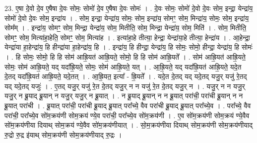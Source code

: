 \documentclass[17pt]{extarticle}
\begin{document}
23. ए॒षा दे॒वो दे॒व ए॒षैषा दे॒वः सोमः॒ सोमो॑ दे॒व ए॒षैषा दे॒वः सोमः॑ । . दे॒वः सोमः॒ सोमो॑ दे॒वो दे॒वः सोम॒ इन्द्रा॒ येन्द्रा॑य॒ सोमो॑ दे॒वो दे॒वः सोम॒ इन्द्रा॑य । . सोम॒ इन्द्रा॒ येन्द्रा॑य॒ सोमः॒ सोम॒ इन्द्रा॑य॒ सोमꣳ॒॒ सोम॒ मिन्द्रा॑य॒ सोमः॒ सोम॒ इन्द्रा॑य॒ सोम᳚म् । . इन्द्रा॑य॒ सोमꣳ॒॒ सोम॒ मिन्द्रा॒ येन्द्रा॑य॒ सोम॒ मितीति॒ सोम॒ मिन्द्रा॒ येन्द्रा॑य॒ सोम॒ मिति॑ । . सोम॒ मितीति॒ सोमꣳ॒॒ सोम॒ मित्या॑हा॒हेति॒ सोमꣳ॒॒ सोम॒ मित्या॑ह । . इत्या॑हा॒हे तीत्या॒ हेन्द्रा॒ येन्द्रा॑या॒हे तीत्या॒ हेन्द्रा॑य । . आ॒हेन्द्रा॒ येन्द्रा॑या हा॒हेन्द्रा॑य॒ हि हीन्द्रा॑या हा॒हेन्द्रा॑य॒ हि । . इन्द्रा॑य॒ हि हीन्द्रा॒ येन्द्रा॑य॒ हि सोमः॒ सोमो॒ हीन्द्रा॒ येन्द्रा॑य॒ हि सोमः॑ । . हि सोमः॒ सोमो॒ हि हि सोम॑ आह्रि॒यत॑ आह्रि॒यते॒ सोमो॒ हि हि सोम॑ आह्रि॒यते᳚ । . सोम॑ आह्रि॒यत॑ आह्रि॒यते॒ सोमः॒ सोम॑ आह्रि॒यते॒ यद् यदा᳚ह्रि॒यते॒ सोमः॒ सोम॑ आह्रि॒यते॒ यत् । . आ॒ह्रि॒यते॒ यद् यदा᳚ह्रि॒यत॑ आह्रि॒यते॒ यदे॒त दे॒तद् यदा᳚ह्रि॒यत॑ आह्रि॒यते॒ यदे॒तत् । . आ॒ह्रि॒यत॒ इत्या᳚ - ह्रि॒यते᳚ । . यदे॒त दे॒तद् यद् यदे॒तद् यजु॒र् यजु॑ रे॒तद् यद् यदे॒तद् यजुः॑ । . ए॒तद् यजु॒र् यजु॑ रे॒त दे॒तद् यजु॒र् न न यजु॑ रे॒त दे॒तद् यजु॒र् न । . यजु॒र् न न यजु॒र् यजु॒र् न ब्रू॒याद् ब्रू॒यान् न यजु॒र् यजु॒र् न ब्रू॒यात् । . न ब्रू॒याद् ब्रू॒यान् न न ब्रू॒यात् परा॑ची॒ परा॑ची ब्रू॒यान् न न ब्रू॒यात् परा॑ची । . ब्रू॒यात् परा॑ची॒ परा॑ची ब्रू॒याद् ब्रू॒यात् परा᳚च्ये॒ वैव परा॑ची ब्रू॒याद् ब्रू॒यात् परा᳚च्ये॒व । . परा᳚च्ये॒ वैव परा॑ची॒ परा᳚च्ये॒व सो॑म॒क्रय॑णी सोम॒क्रय॑ ण्ये॒व परा॑ची॒ परा᳚च्ये॒व सो॑म॒क्रय॑णी । . ए॒व सो॑म॒क्रय॑णी सोम॒क्रय॑ ण्ये॒वैव सो॑म॒क्रय॑णीया दियाथ् सोम॒क्रय॑ ण्ये॒वैव सो॑म॒क्रय॑णीयात् । . सो॒म॒क्रय॑णीया दियाथ् सोम॒क्रय॑णी सोम॒क्रय॑णीयाद् रु॒द्रो रु॒द्र इ॑याथ् सोम॒क्रय॑णी सोम॒क्रय॑णीयाद् रु॒द्रः । \newline
\end{document}
